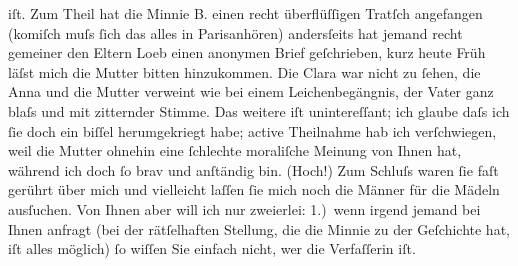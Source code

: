 \begin{ledgroupsized}[t]{13cm}
                    iſt.\pend
           \pstart
           Zum Theil hat die Minnie B. einen recht
                    überflüſſigen Tratſch angefangen (komiſch muſs ſich das alles in Parisanhören) andersſeits hat
                    jemand recht gemeiner den Eltern Loeb
                    einen anonymen Brief geſchrieben, kurz heute Früh läſst mich die Mutter bitten hinzukommen.
                    Die Clara war nicht zu ſehen, die Anna und die Mutter verweint wie bei einem Leichenbegängnis, der
                        Vater ganz blaſs und
                    mit zitternder Stimme. Das weitere iſt unintereſſant; ich glaube daſs ich ſie
                    doch ein biſſel herumgekriegt {\pb}habe;  active Theilnahme hab ich
                    verſchwiegen, weil die Mutter ohnehin eine ſchlechte moraliſche Meinung von Ihnen hat,
                    während ich doch ſo brav und anſtändig bin. (Hoch!)\pend
           \pstart
           Zum Schluſs waren ſie faſt gerührt über mich und vielleicht laſſen ſie mich noch die Männer für die Mädeln ausſuchen.
                    Von Ihnen aber will ich nur zweierlei: 1.) wenn irgend jemand bei Ihnen anfragt
                    (bei der rätſelhaften Stellung, die {\pb}die Minnie zu der Geſchichte hat, iſt alles möglich) ſo
                    wiſſen Sie einfach nicht, wer die Verfaſſerin iſt.\pend
           \pstart

\end{ledgroupsized}
